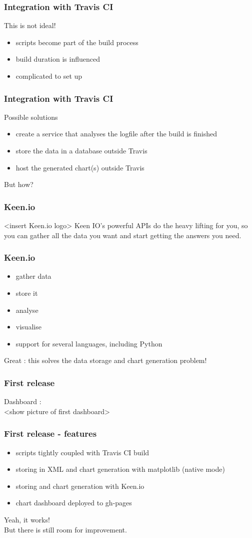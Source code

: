 \documentclass[14pt]{beamer}
\begin{document}
  \begin{frame}
    \frametitle{Integration with Travis CI}
    This is not ideal!
    \begin{itemize}
      \item scripts become part of the build process
      \item build duration is influenced
      \item complicated to set up
    \end{itemize}
  \end{frame}
  \begin{frame}
    \frametitle{Integration with Travis CI}
    Possible solutions
    \begin{itemize}
      \item create a service that analyses the logfile after the build is finished
      \item store the data in a database outside Travis
      \item host the generated chart(s) outside Travis
    \end{itemize}
    But how?
  \end{frame}
  \begin{frame}
    \frametitle{Keen.io}
    <insert Keen.io logo>
    Keen IO's powerful APIs do the heavy lifting for you, so you can gather all the data you want and start getting the answers you need. 
  \end{frame}
  \begin{frame}
    \frametitle{Keen.io}
    \begin{itemize}
      \item gather data
      \item store it
      \item analyse
      \item visualise
      \item support for several languages, including Python
    \end{itemize}
    Great : this solves the data storage and chart generation problem!
  \end{frame}
  \begin{frame}
    \frametitle{First release}
    Dashboard :\\
    <show picture of first dashboard>
  \end{frame}
  \begin{frame}
    \frametitle{First release - features}
    \begin{itemize}
      \item scripts tightly coupled with Travis CI build
      \item storing in XML and chart generation with matplotlib (native mode)
      \item storing and chart generation with Keen.io
      \item chart dashboard deployed to gh-pages
    \end{itemize}
    Yeah, it works!\\
    \pause
    But there is still room for improvement.
  \end{frame}
\end{document}
